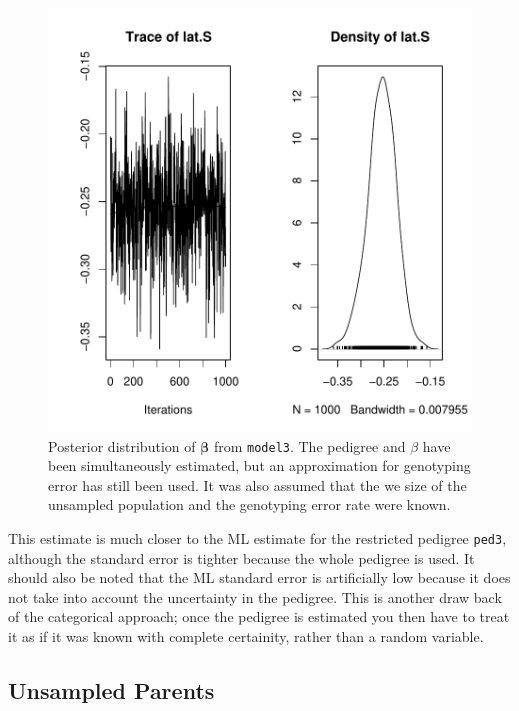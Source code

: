 \documentclass{article}
\begin{document}
\begin{figure}[!h]
\begin{center}
\includegraphics{Tutorial-027}
\end{center}
\caption{Posterior distribution of $\bm{\beta}$ from \texttt{model3}. The pedigree and $\beta$ have been simultaneously estimated, but an approximation for genotyping error has still been used. It was also assumed that the we size of the unsampled population and the genotyping error rate were known.}
\label{model3beta-fig}
\end{figure}


This estimate is much closer to the ML estimate for the restricted pedigree \texttt{ped3}, although the standard error is tighter because the whole pedigree is used.  It should also be noted that the ML standard error is artificially low because it does not take into account the uncertainty in the pedigree.  This is another draw back of the categorical approach; once the pedigree is estimated you then have to treat it as if it was known with complete certainity, rather than a random variable. \\

\subsection{Unsampled Parents}
\label{us-sec}
\end{document}
